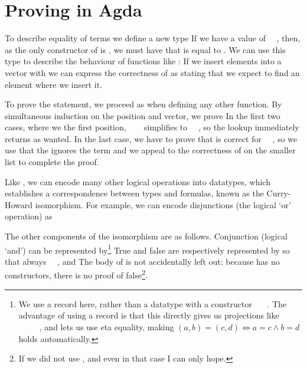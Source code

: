\section{Proving in Agda}\label{sec:background-proving}
To describe equality of terms we define a new type
If we have a value  of \ \ , then, as the only constructor of  is , we must have that  is equal to . We can use this type to describe the behaviour of functions like : If we insert elements into a vector with
we can express the correctness of  as
stating that we expect to find an element where we insert it.


To prove the statement, we proceed as when defining any other function. 
By simultaneous induction on the position and vector, we prove
In the first two cases, where we  the first position, \ \ \  simplifies to \ \ , so the lookup immediately returns  as wanted. In the last case, we have to prove that  is correct for \ \ , so we use that the  ignores the term  and we appeal to the correctness of  on the smaller list  to complete the proof.

Like , we can encode many other logical operations into datatypes, which establishes a correspondence between types and formulas, known as the Curry-Howard isomorphism. For example, we can encode disjunctions (the logical `or' operation) as

The other components of the isomorphism are as follows. Conjunction (logical `and') can be represented by\footnote{We use a record here, rather than a datatype with a constructor \ \ \ . The advantage of using a record is that this directly gives us projections like \ \AV{:}\ \ \ \ , and lets us use eta equality, making $(a, b) = (c , d) \iff a = c \land b = d$ holds automatically.}
True and false are respectively represented by
so that always \ \AV{:}\ , and 
The body of  is not accidentally left out: because  has no constructors, there is no proof of false\footnote{If we did not use , and even in that case I can only hope.}.


